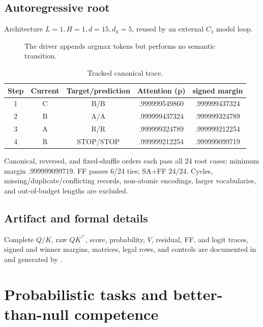 \documentclass[10pt]{article}
\begin{document}
\subsection{Autoregressive root}
Architecture $L=1,H=1,d=15,d_h=5$, reused by an external $C_1$ model loop.
\begin{figure}[H]\centering{}\caption{The driver appends argmax tokens but performs no semantic transition.}\end{figure}
\begin{table}[H]\centering\small\begin{tabular}{ccccc}\toprule Step&Current&Target/prediction&Attention (p)&signed margin\\\midrule1&C&B/B&.999999549860&.999999437324\\2&B&A/A&.999999437324&.999999324789\\3&A&R/R&.999999324789&.999999212254\\4&R&STOP/STOP&.999999212254&.999999099719\\\bottomrule\end{tabular}\caption{Tracked canonical trace.}\end{table}
Canonical, reversed, and fixed-shuffle orders each pass all 24 root cases; minimum margin .999999099719. FF passes 6/24 ties; SA+FF 24/24. Cycles, missing/duplicate/conflicting records, non-atomic encodings, larger vocabularies, and out-of-budget lengths are excluded.

\subsection{Artifact and formal details}
Complete $Q/K$, raw $QK^\top$, score, probability, $V$, residual, FF, and logit traces, signed and winner margins, matrices, legal rows, and controls are documented in  and generated by .

\section{Probabilistic tasks and better-than-null competence}
\end{document}
